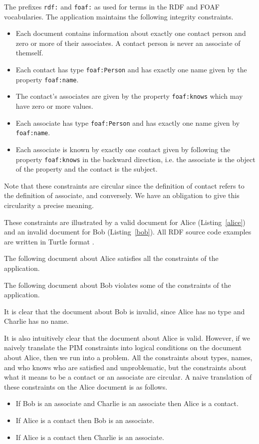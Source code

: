 \documentclass{article}
\begin{document}
The prefixes {\tt rdf:} and {\tt foaf:} as used for terms in the RDF\cite{w3c:rdf11} and FOAF\cite{foaf:spec} vocabularies.
The application maintains the following integrity constraints.
\cbend
\begin{itemize}
\item Each document contains information about exactly one contact person and zero or more of their associates.
\cbstart
A contact person is never an associate of themself.
\cbend
\item Each contact has type {\tt foaf:Person} and has exactly one name given by the property {\tt foaf:name}.
\item The contact's associates are given by the property {\tt foaf:knows} which may have zero or more values.
\item Each associate has type {\tt foaf:Person} and has exactly one name given by {\tt foaf:name}.
\item Each associate is known by exactly one contact given by following the property {\tt foaf:knows} in the backward direction, i.e. the associate is the object of the property and the contact is the subject.
\end{itemize}

Note that these constraints are circular since the definition of contact refers to the definition of associate, and conversely.
We have an obligation to give this circularity a precise meaning.

These constraints are illustrated by a valid document for Alice (Listing~\ref{alice}) and an invalid document for Bob (Listing~\ref{bob}).
All RDF source code examples are written in Turtle format \cite{w3c:turtle11}.

The following document about Alice satisfies all the constraints of the application.


The following document about Bob violates some of the constraints of the application.


\cbstart
It is clear that the document about Bob is invalid, since Alice has no type and Charlie has no name.

It is also intuitively clear that the document about Alice is valid.
However, if we naively translate the PIM constraints into logical conditions on the document about Alice, then we run into a problem.
All the constraints about types, names, and who knows who are satisfied and unproblematic, but the
constraints about what it means to be a contact or an associate are circular.
A naive translation of these constraints on the Alice document is as follows.
\begin{itemize}
\item If Bob is an associate and Charlie is an associate then Alice is a contact.
\item If Alice is a contact then Bob is an associate.
\item If Alice is a contact then Charlie is an associate.
\end{itemize}
\end{document}
